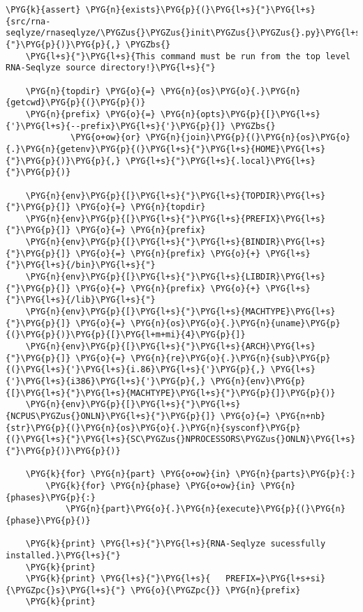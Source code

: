 \begin{Verbatim}[commandchars=\\\{\}]
    \PYG{k}{assert} \PYG{n}{exists}\PYG{p}{(}\PYG{l+s}{"}\PYG{l+s}{src/rna-seqlyze/rnaseqlyze/\PYGZus{}\PYGZus{}init\PYGZus{}\PYGZus{}.py}\PYG{l+s}{"}\PYG{p}{)}\PYG{p}{,} \PYGZbs{}
    \PYG{l+s}{"}\PYG{l+s}{This command must be run from the top level RNA-Seqlyze source directory!}\PYG{l+s}{"}

    \PYG{n}{topdir} \PYG{o}{=} \PYG{n}{os}\PYG{o}{.}\PYG{n}{getcwd}\PYG{p}{(}\PYG{p}{)}
    \PYG{n}{prefix} \PYG{o}{=} \PYG{n}{opts}\PYG{p}{[}\PYG{l+s}{'}\PYG{l+s}{--prefix}\PYG{l+s}{'}\PYG{p}{]} \PYGZbs{}
             \PYG{o+ow}{or} \PYG{n}{join}\PYG{p}{(}\PYG{n}{os}\PYG{o}{.}\PYG{n}{getenv}\PYG{p}{(}\PYG{l+s}{"}\PYG{l+s}{HOME}\PYG{l+s}{"}\PYG{p}{)}\PYG{p}{,} \PYG{l+s}{"}\PYG{l+s}{.local}\PYG{l+s}{"}\PYG{p}{)}

    \PYG{n}{env}\PYG{p}{[}\PYG{l+s}{"}\PYG{l+s}{TOPDIR}\PYG{l+s}{"}\PYG{p}{]} \PYG{o}{=} \PYG{n}{topdir}
    \PYG{n}{env}\PYG{p}{[}\PYG{l+s}{"}\PYG{l+s}{PREFIX}\PYG{l+s}{"}\PYG{p}{]} \PYG{o}{=} \PYG{n}{prefix}
    \PYG{n}{env}\PYG{p}{[}\PYG{l+s}{"}\PYG{l+s}{BINDIR}\PYG{l+s}{"}\PYG{p}{]} \PYG{o}{=} \PYG{n}{prefix} \PYG{o}{+} \PYG{l+s}{"}\PYG{l+s}{/bin}\PYG{l+s}{"}
    \PYG{n}{env}\PYG{p}{[}\PYG{l+s}{"}\PYG{l+s}{LIBDIR}\PYG{l+s}{"}\PYG{p}{]} \PYG{o}{=} \PYG{n}{prefix} \PYG{o}{+} \PYG{l+s}{"}\PYG{l+s}{/lib}\PYG{l+s}{"}
    \PYG{n}{env}\PYG{p}{[}\PYG{l+s}{"}\PYG{l+s}{MACHTYPE}\PYG{l+s}{"}\PYG{p}{]} \PYG{o}{=} \PYG{n}{os}\PYG{o}{.}\PYG{n}{uname}\PYG{p}{(}\PYG{p}{)}\PYG{p}{[}\PYG{l+m+mi}{4}\PYG{p}{]}
    \PYG{n}{env}\PYG{p}{[}\PYG{l+s}{"}\PYG{l+s}{ARCH}\PYG{l+s}{"}\PYG{p}{]} \PYG{o}{=} \PYG{n}{re}\PYG{o}{.}\PYG{n}{sub}\PYG{p}{(}\PYG{l+s}{'}\PYG{l+s}{i.86}\PYG{l+s}{'}\PYG{p}{,} \PYG{l+s}{'}\PYG{l+s}{i386}\PYG{l+s}{'}\PYG{p}{,} \PYG{n}{env}\PYG{p}{[}\PYG{l+s}{"}\PYG{l+s}{MACHTYPE}\PYG{l+s}{"}\PYG{p}{]}\PYG{p}{)}
    \PYG{n}{env}\PYG{p}{[}\PYG{l+s}{"}\PYG{l+s}{NCPUS\PYGZus{}ONLN}\PYG{l+s}{"}\PYG{p}{]} \PYG{o}{=} \PYG{n+nb}{str}\PYG{p}{(}\PYG{n}{os}\PYG{o}{.}\PYG{n}{sysconf}\PYG{p}{(}\PYG{l+s}{"}\PYG{l+s}{SC\PYGZus{}NPROCESSORS\PYGZus{}ONLN}\PYG{l+s}{"}\PYG{p}{)}\PYG{p}{)}

    \PYG{k}{for} \PYG{n}{part} \PYG{o+ow}{in} \PYG{n}{parts}\PYG{p}{:}
        \PYG{k}{for} \PYG{n}{phase} \PYG{o+ow}{in} \PYG{n}{phases}\PYG{p}{:}
            \PYG{n}{part}\PYG{o}{.}\PYG{n}{execute}\PYG{p}{(}\PYG{n}{phase}\PYG{p}{)}

    \PYG{k}{print} \PYG{l+s}{"}\PYG{l+s}{RNA-Seqlyze sucessfully installed.}\PYG{l+s}{"}
    \PYG{k}{print}
    \PYG{k}{print} \PYG{l+s}{"}\PYG{l+s}{   PREFIX=}\PYG{l+s+si}{\PYGZpc{}s}\PYG{l+s}{"} \PYG{o}{\PYGZpc{}} \PYG{n}{prefix}
    \PYG{k}{print}
\end{Verbatim}


